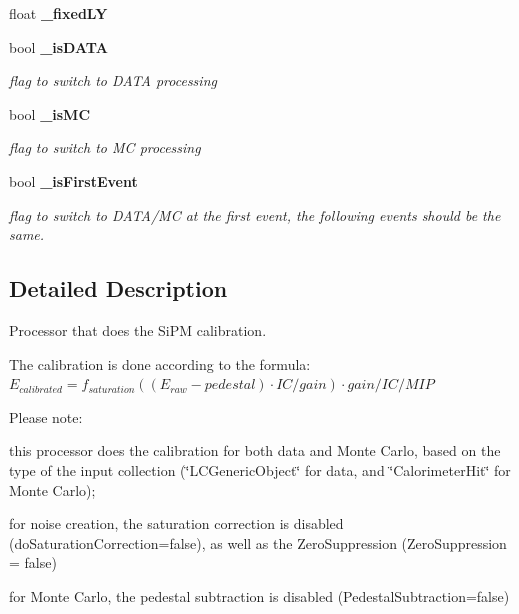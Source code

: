 \begin{DoxyCompactItemize}
\item 
float {\bfseries \-\_\-fixed\-L\-Y}\label{classCALICE_1_1SiPMCalibrateProcessor_a29bf0f8380c4f017874bc0dad44d8a00}

\item 
bool {\bf \-\_\-is\-D\-A\-T\-A}\label{classCALICE_1_1SiPMCalibrateProcessor_a470adc298f88f9e78ae24aa67be702d3}

\begin{DoxyCompactList}\small\item\em flag to switch to D\-A\-T\-A processing \end{DoxyCompactList}\item 
bool {\bf \-\_\-is\-M\-C}\label{classCALICE_1_1SiPMCalibrateProcessor_aa6bcd2af91b68af922b9b34224a0d8b1}

\begin{DoxyCompactList}\small\item\em flag to switch to M\-C processing \end{DoxyCompactList}\item 
bool {\bf \-\_\-is\-First\-Event}
\begin{DoxyCompactList}\small\item\em flag to switch to D\-A\-T\-A/\-M\-C at the first event, the following events should be the same. \end{DoxyCompactList}\end{DoxyCompactItemize}


\subsection{Detailed Description}
Processor that does the Si\-P\-M calibration. 

The calibration is done according to the formula\-: $E_{calibrated}=f_{saturation}((E_{raw}-pedestal) \cdot IC/gain) \cdot gain/IC/MIP$

Please note\-:
\begin{DoxyItemize}
\item this processor does the calibration for both data and Monte Carlo, based on the type of the input collection (\char`\"{}\-L\-C\-Generic\-Object\char`\"{} for data, and \char`\"{}\-Calorimeter\-Hit\char`\"{} for Monte Carlo);
\item for noise creation, the saturation correction is disabled (do\-Saturation\-Correction=false), as well as the Zero\-Suppression (Zero\-Suppression = false)
\item for Monte Carlo, the pedestal subtraction is disabled (Pedestal\-Subtraction=false)
\end{DoxyItemize}

